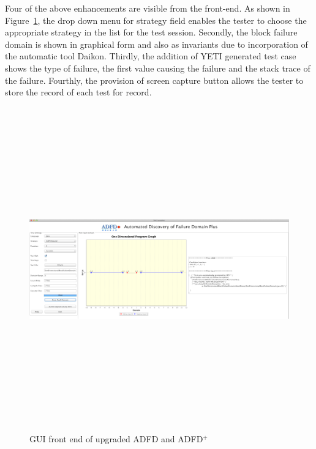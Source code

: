 Four of the above enhancements are visible from the front-end. As shown in Figure~\ref{fig:adfdUpgraded}, the drop down menu for strategy field enables the tester to choose the appropriate strategy in the list for the test session. Secondly, the block failure domain is shown in graphical form and also as invariants due to incorporation of the automatic tool Daikon. Thirdly, the addition of YETI generated test case shows the type of failure, the first value causing the failure and the stack trace of the failure. Fourthly, the provision of screen capture button allows the tester to store the record of each test for record.



\clearpage
\newpage

\begin{figure}
\centering
\centerline{\includegraphics[width=22cm,height=14cm]{chapter7/adfdUpgraded1.png}}
\caption{GUI front end of upgraded ADFD and ADFD$^+$}
\label{fig:adfdUpgraded}
\end{figure}



